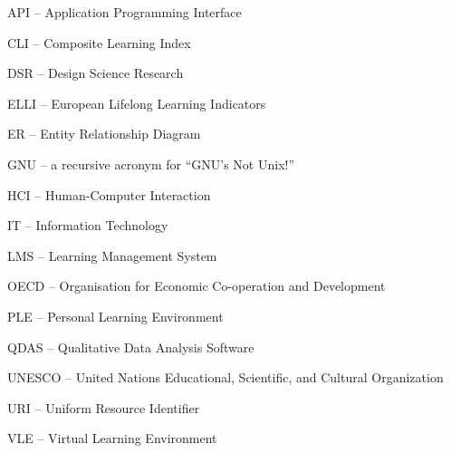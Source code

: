 API -- Application Programming Interface

CLI -- Composite Learning Index

DSR -- Design Science Research

ELLI -- European Lifelong Learning Indicators

ER -- Entity Relationship Diagram

GNU -- a recursive acronym for ``GNU's Not Unix!''

HCI -- Human-Computer Interaction

IT -- Information Technology

LMS -- Learning Management System

OECD -- Organisation for Economic Co-operation and Development

PLE -- Personal Learning Environment

QDAS -- Qualitative Data Analysis Software

UNESCO -- United Nations Educational, Scientific, and Cultural Organization

URI -- Uniform Resource Identifier

VLE -- Virtual Learning Environment




